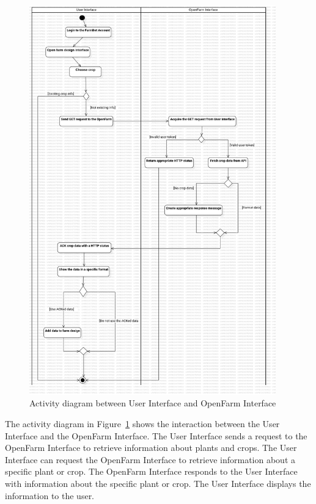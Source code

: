 \begin{figure}[H]
    \centering
    \includegraphics[width=0.95\textwidth]{Figures/ActivityDiagram_openfarmPipeline.png}
    \caption{Activity diagram between User Interface and OpenFarm Interface}\label{fig:ActivityDiagram_openfarmPipeline}
\end{figure}

The activity diagram in Figure~\ref{fig:ActivityDiagram_openfarmPipeline} shows the interaction between the User Interface and the OpenFarm Interface. The User Interface sends a request to the OpenFarm Interface to retrieve information about plants and crops. The User Interface can request the OpenFarm Interface to retrieve information about a specific plant or crop. The OpenFarm Interface responds to the User Interface with information about the specific plant or crop. The User Interface displays the information to the user.


